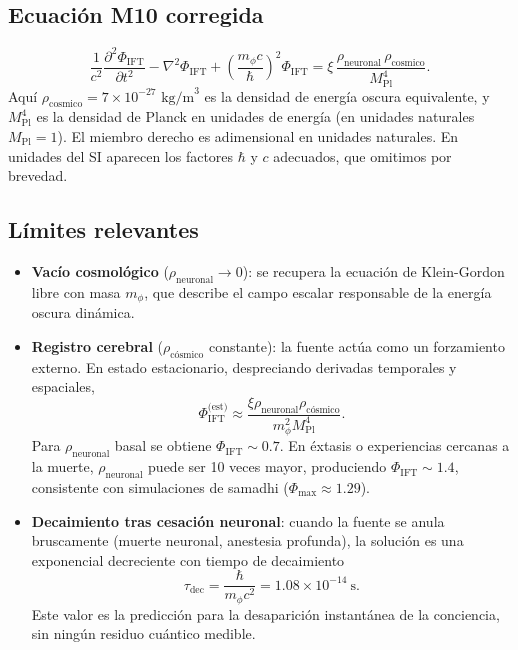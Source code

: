 \documentclass[12pt, a4paper]{article}
\theoremstyle{miuThm}
\theoremstyle{remark}
\newcommand{\MPl}{M_{\text{Pl}}} %
\begin{document}
\subsection{Ecuación M10 corregida}
\begin{equation}
\boxed{
\frac{1}{c^2}\frac{\partial^2 \Phi_{\text{IFT}}}{\partial t^2} - \nabla^2 \Phi_{\text{IFT}} + \left(\frac{m_\phi c}{\hbar}\right)^2 \Phi_{\text{IFT}} = \xi \, \frac{\rho_{\text{neuronal}} \, \rho_{\text{cosmico}}}{\MPl^4}
}.
\end{equation}
Aquí $\rho_{\text{cosmico}} = 7\times10^{-27}\text{ kg/m}^3$ es la densidad de energía oscura equivalente, y $M_{\text{Pl}}^4$ es la densidad de Planck en unidades de energía (en unidades naturales $M_{\text{Pl}}=1$). El miembro derecho es adimensional en unidades naturales. En unidades del SI aparecen los factores $\hbar$ y $c$ adecuados, que omitimos por brevedad.

\subsection{Límites relevantes}
\begin{itemize}
\item \textbf{Vacío cosmológico} ($\rho_{\text{neuronal}}\to0$): se recupera la ecuación de Klein-Gordon libre con masa $m_\phi$, que describe el campo escalar responsable de la energía oscura dinámica.
\item \textbf{Registro cerebral} ($\rho_{\text{cósmico}}$ constante): la fuente actúa como un forzamiento externo. En estado estacionario, despreciando derivadas temporales y espaciales,
\begin{equation}
\Phi_{\text{IFT}}^{\text{(est)}} \approx \frac{\xi \rho_{\text{neuronal}} \rho_{\text{cósmico}}}{m_\phi^2 M_{\text{Pl}}^4}.
\end{equation}
Para $\rho_{\text{neuronal}}$ basal se obtiene $\Phi_{\text{IFT}} \sim 0.7$. En éxtasis o experiencias cercanas a la muerte, $\rho_{\text{neuronal}}$ puede ser 10 veces mayor, produciendo $\Phi_{\text{IFT}} \sim 1.4$, consistente con simulaciones de samadhi ($\Phi_{\max}\approx1.29$).
\item \textbf{Decaimiento tras cesación neuronal}: cuando la fuente se anula bruscamente (muerte neuronal, anestesia profunda), la solución es una exponencial decreciente con tiempo de decaimiento
\begin{equation}
\tau_{\text{dec}} = \frac{\hbar}{m_\phi c^2} = 1.08\times10^{-14}\ \text{s}.
\end{equation}
Este valor es la predicción para la desaparición instantánea de la conciencia, sin ningún residuo cuántico medible.
\end{itemize}
\end{document}
